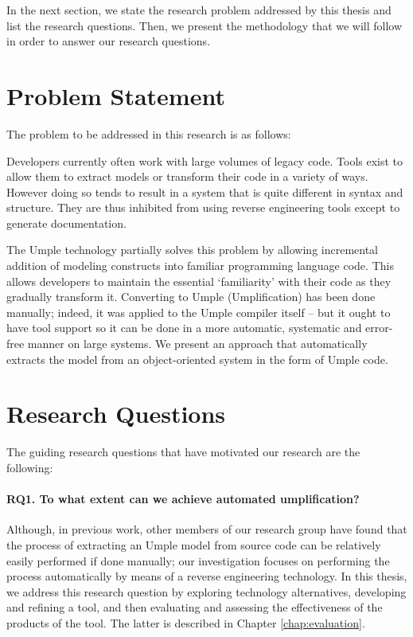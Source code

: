In the next section, we state the research problem addressed by this thesis and list the research questions. Then, we present the methodology that we will follow in order to answer our research questions.

\section{Problem Statement}
The problem to be addressed in this research is as follows:

Developers currently often work with large volumes of legacy code. Tools exist to allow them to extract models or transform their code in a variety of ways. However doing so tends to result in a system that is quite different in syntax and structure. They are thus inhibited from using reverse engineering tools except to generate documentation.

The Umple technology partially solves this problem by allowing incremental addition of modeling constructs into familiar programming language code. This allows developers to maintain the essential `familiarity' with their code as they gradually transform it. Converting to Umple (Umplification) has been done manually; indeed, it was applied to the Umple compiler itself \cite{Lethbridge2010c} –  but it ought to have tool support so it can be done in a more automatic, systematic and error-free manner on large systems. We present an approach that automatically extracts the model from an object-oriented system in the form of Umple code. 

\section{Research Questions}

The guiding research questions that have motivated our research are the following:
\paragraph*{RQ1. To what extent can we achieve automated umplification?}
Although, in previous work, other members of our research group have found that the process of extracting an Umple model from source code can be relatively easily performed if done manually; our investigation focuses on performing the process automatically by means of a reverse engineering technology. 
In this thesis, we address this research question by exploring technology alternatives, developing and refining a tool, and then evaluating and assessing the effectiveness of the products of the tool. The latter is described in Chapter \ref{chap:evaluation}.
